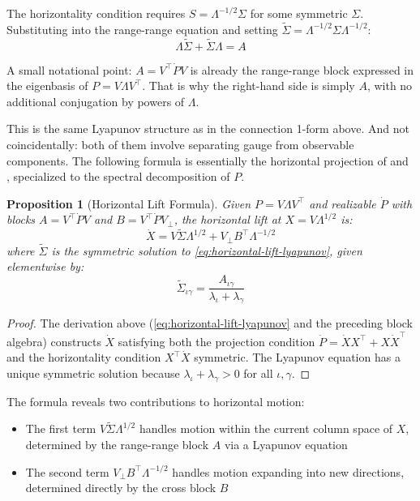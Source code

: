 \documentclass{article}
\theoremstyle{plain}
\newtheorem{proposition}{Proposition}
\theoremstyle{definition}
\theoremstyle{remark}
\begin{document}
The horizontality condition requires $S = \Lambda^{-1/2} \Sigma$ for some symmetric $\Sigma$.
Substituting into the range-range equation and setting $\tilde{\Sigma} = \Lambda^{-1/2} \Sigma \Lambda^{-1/2}$:
\begin{equation}\label{eq:horizontal-lift-lyapunov}
\Lambda \tilde{\Sigma} + \tilde{\Sigma} \Lambda = A
\end{equation}

A small notational point: $A = V^\top \dot{P} V$ is already the range-range block expressed in the eigenbasis of $P = V \Lambda V^\top$. That is why the right-hand side is simply $A$, with no additional conjugation by powers of $\Lambda$.

This is the same Lyapunov structure as in the connection 1-form above. And not coincidentally: both of them involve separating gauge from observable components. The following formula is essentially the horizontal projection of \citet{absil2008optimization} and \citet{massart2020quotient}, specialized to the spectral decomposition of $P$.

\begin{proposition}[Horizontal Lift Formula]
Given $P = V \Lambda V^\top$ and realizable $\dot{P}$ with blocks $A = V^\top \dot{P} V$ and $B = V^\top \dot{P} V_\perp$, the horizontal lift at $X = V \Lambda^{1/2}$ is:
\begin{equation}
\dot{X} = V \tilde{\Sigma} \Lambda^{1/2} + V_\perp B^\top \Lambda^{-1/2}
\end{equation}
where $\tilde{\Sigma}$ is the symmetric solution to \cref{eq:horizontal-lift-lyapunov}, given elementwise by:
\begin{equation}
\tilde{\Sigma}_{\iota\gamma} = \frac{A_{\iota\gamma}}{\lambda_\iota + \lambda_\gamma}
\end{equation}
\end{proposition}

\begin{proof}
The derivation above (\cref{eq:horizontal-lift-lyapunov} and the preceding block algebra) constructs $\dot{X}$ satisfying both the projection condition $\dot{P} = \dot{X} X^\top + X \dot{X}^\top$ and the horizontality condition $X^\top \dot{X}$ symmetric.
The Lyapunov equation has a unique symmetric solution because $\lambda_\iota + \lambda_\gamma > 0$ for all $\iota, \gamma$.
\end{proof}

The formula reveals two contributions to horizontal motion:
\begin{itemize}
\item The first term $V \tilde{\Sigma} \Lambda^{1/2}$ handles motion within the current column space of $X$, determined by the range-range block $A$ via a Lyapunov equation
\item The second term $V_\perp B^\top \Lambda^{-1/2}$ handles motion expanding into new directions, determined directly by the cross block $B$
\end{itemize}
\end{document}
